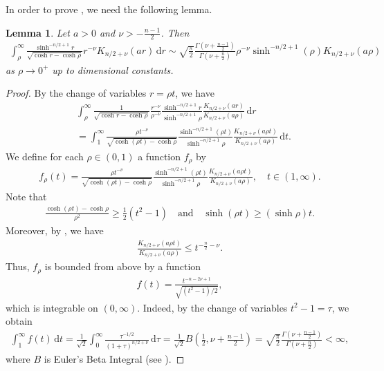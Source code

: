 \documentclass[11pt]{amsart}
\theoremstyle{plain}
\newtheorem{lemma}[theorem]{Lemma}
\theoremstyle{definition}
\numberwithin{equation}{section}
\begin{document}
In order to prove , we need the following lemma.

\begin{lemma} \label{lem:even_dim}
  Let $a>0$ and $\nu > -\frac{n-1}{2}$. Then
  \begin{align*}
    \int^{\infty}_{\rho} \frac{\sinh^{-n/2+1} r}{\sqrt{\cosh r-\cosh \rho}} r^{-\nu}K_{n/2 + \nu} (ar) \,\mathrm{d} r \sim \sqrt{\frac{\pi}{2}} \frac{\Gamma(\nu+\frac{n-1}{2})}{\Gamma(\nu+\frac{n}{2})} \rho^{-\nu}\sinh^{-n/2 +1} (\rho)K_{n/2+\nu} (a\rho) 
  \end{align*}
  as $\rho \to 0^{+}$ up to dimensional constants.
\end{lemma}

\begin{proof}
By the change of variables $r=\rho t$, we have
  \begin{align*}
    &\int_\rho^\infty \frac{1}{\sqrt{\cosh r-\cosh \rho}} \frac{r^{-\nu}}{\rho^{-\nu}} \frac{\sinh^{-n/2+1}r}{\sinh^{-n/2+1}\rho} \frac{K_{n/2 + \nu} (ar)}{K_{n/2 + \nu} (a\rho)} \,\mathrm{d} r \\
    &= \int ^ \infty_1 \frac{\rho t^{-\nu}}{\sqrt{\cosh(\rho t)-\cosh \rho}} \frac{\sinh^{-n/2+1}(\rho t)}{\sinh^{-n/2+1}\rho}\frac{K_{n/2 + \nu} (a\rho t)}{K_{n/2 + \nu} (a\rho)} \,\mathrm{d}t.
  \end{align*}
  We define for each $\rho \in (0,1)$ a function $f_\rho$ by
  \begin{align*}
    f_\rho(t) = \frac{\rho t^{-\nu}}{\sqrt{\cosh(\rho t)-\cosh \rho}} \frac{\sinh^{-n/2+1}(\rho t)}{\sinh^{-n/2+1}\rho}\frac{K_{n/2 + \nu} (a\rho t)}{K_{n/2 + \nu} (a\rho)}, \quad t \in (1, \infty).
  \end{align*}
Note that
  \begin{align*}
    \frac{\cosh(\rho t) - \cosh\rho}{\rho^2}   \ge \frac{1}{2}(t^2-1) \quad\text{and}\quad \sinh(\rho t) \ge (\sinh\rho)t.
  \end{align*}
  Moreover, by \cite[Equation (2.17)]{JB96}, we have
  \begin{align*}
    \frac{K_{n/2 + \nu} (a\rho t)}{K_{n/2 + \nu} (a\rho)} \le t^{-\frac{n}{2}-\nu}.
  \end{align*}
  Thus, $f_\rho$ is bounded from above by a function
  \begin{align*}
    f(t) = \frac{t^{-n-2\nu +1 }}{\sqrt{(t^2-1)/2}},
  \end{align*}
  which is integrable on $(0,\infty)$. Indeed, by the change of variables $t^2-1 = \tau$, we obtain
  \begin{align*}
    \int_1^\infty f(t) \,\mathrm{d} t = \frac{1}{\sqrt{2}} \int_0 ^ \infty \frac{\tau^{-1/2}}{(1+\tau)^{n/2+\nu}} \,\mathrm{d} \tau  = \frac{1}{\sqrt{2}} B\left(\frac{1}{2}, \nu+\frac{n-1}{2}   \right)= \sqrt{\frac{\pi}{2}} \frac{\Gamma(\nu+\frac{n-1}{2})}{\Gamma(\nu+\frac{n}{2})} < \infty,
  \end{align*}
  where $B$ is Euler's Beta Integral (see \cite[5.12.3]{OLBC10}).
  

\end{proof}
\end{document}
